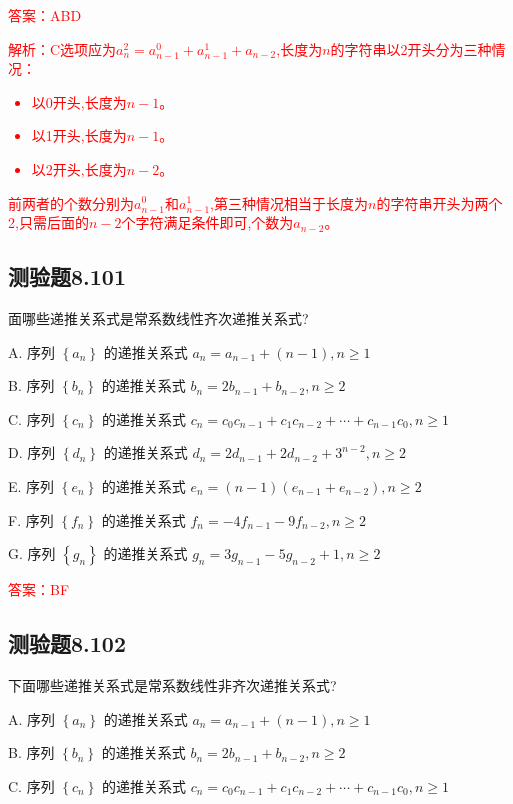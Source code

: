\documentclass[UTF8, heading=true]{ctexart}
\begin{document}
\textcolor{red}{答案：ABD}

\textcolor{red}{解析：C选项应为$a_n^2=a_{n-1}^0+a_{n-1}^1+a_{n-2}$,长度为$n$的字符串以2开头分为三种情况：
\begin{itemize}
  \item 以0开头,长度为$n-1$。
  \item 以1开头,长度为$n-1$。
  \item 以2开头,长度为$n-2$。
\end{itemize}
前两者的个数分别为$a_{n-1}^0$和$a_{n-1}^1$,第三种情况相当于长度为$n$的字符串开头为两个2,只需后面的$n-2$个字符满足条件即可,个数为$a_{n-2}$。
}

\subsection{测验题8.101}

面哪些递推关系式是常系数线性齐次递推关系式?

A. 序列 $\left\{a_n\right\}$ 的递推关系式 $a_n=a_{n-1}+(n-1),  n \geq 1$

B. 序列 $\left\{b_n\right\}$ 的递推关系式 $b_n=2 b_{n-1}+b_{n-2},  n \geq 2$

C. 序列 $\left\{c_n\right\}$ 的递推关系式 $c_n=c_0 c_{n-1}+c_1 c_{n-2}+\cdots+c_{n-1} c_0,  n \geq 1$

D. 序列 $\left\{d_n\right\}$ 的递推关系式 $d_n=2 d_{n-1}+2 d_{n-2}+3^{n-2},  n \geq 2$

E. 序列 $\left\{e_n\right\}$ 的递推关系式 $e_n=(n-1)\left(e_{n-1}+e_{n-2}\right),  n \geq 2$

F. 序列 $\left\{f_n\right\}$ 的递推关系式 $f_n=-4 f_{n-1}-9 f_{n-2},  n \geq 2$

G. 序列 $\left\{g_n\right\}$ 的递推关系式 $g_n=3 g_{n-1}-5 g_{n-2}+1, n \geq 2$

\textcolor{red}{答案：BF}

\subsection{测验题8.102}

下面哪些递推关系式是常系数线性非齐次递推关系式?

A. 
序列 $\left\{a_n\right\}$ 的递推关系式 $a_n=a_{n-1}+(n-1), n \geq 1$

B. 
序列 $\left\{b_n\right\}$ 的递推关系式 $b_n=2 b_{n-1}+b_{n-2}, n \geq 2$

C. 
序列 $\left\{c_n\right\}$ 的递推关系式 $c_n=c_0 c_{n-1}+c_1 c_{n-2}+\cdots+c_{n-1} c_0, n \geq 1$
\end{document}
